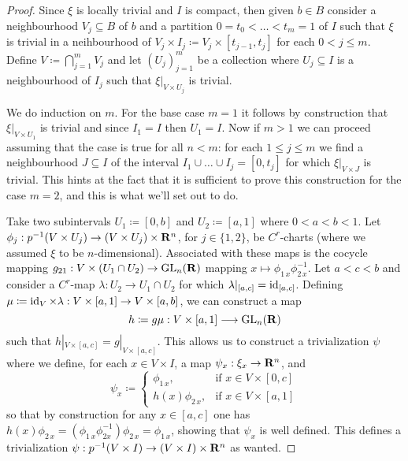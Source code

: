 \documentclass[../../../deep-dive]{subfile}
\begin{document}
\begin{proof}
Since \(\xi\) is locally trivial and \(I\) is compact, then given \(b \in B\)
consider a neighbourhood \(V_j \subseteq B\) of \(b\) and a partition
\(0 = t_0 < \dots < t_m = 1\) of \(I\) such that \(\xi\) is trivial in a
neihbourhood of \(V_j \times I_j \coloneq V_j \times [t_{j-1}, t_j]\) for each
\(0 < j \leq m\). Define \(V \coloneq \bigcap_{j=1}^m V_j\) and let
\((U_j)_{j=1}^m\) be a collection where \(U_j \subseteq I\) is a neighbourhood
of \(I_j\) such that \(\xi|_{V \times U_j}\) is trivial.

We do induction on \(m\). For the base case \(m = 1\) it follows by construction
that \(\xi|_{V \times U_1}\) is trivial and since \(I_1 = I\) then \(U_1 =
I\). Now if \(m > 1\) we can proceed assuming that the case is true for all
\(n < m\): for each \(1 \leq j \leq m\) we find a neighbourhood
\(J \subseteq I\) of the interval \(I_1 \cup \dots \cup I_j = [0, t_j]\) for
which \(\xi|_{V \times J}\) is trivial. This hints at the fact that it is
sufficient to prove this construction for the case \(m = 2\), and this is what
we'll set out to do.

Take two subintervals \(U_1 \coloneq [0, b]\) and \(U_2 \coloneq [a, 1]\) where
\(0 < a < b < 1\). Let
\(\phi_j: p^{-1}(V \times U_j) \to (V \times U_j) \times \mathbf{R}^n\), for
\(j \in \{1, 2\}\), be \(C^r\)-charts (where we assumed \(\xi\) to be
\(n\)-dimensional). Associated with these maps is the cocycle mapping
\(g_{2 1}: V \times (U_1 \cap U_2) \to \operatorname{GL}_n(\mathbf{R})\) mapping
\(x \mapsto \phi_{1\, x} \phi_{2\, x}^{-1}\). Let \(a < c < b\) and consider a
\(C^r\)-map \(\lambda: U_2 \to U_1 \cap U_2\) for which
\(\lambda|_{[a, c]} = \operatorname{id}_{[a, c]}\). Defining \(\mu \coloneq \operatorname{id}_V \times
\lambda: V \times [a, 1] \to V \times [a, b]\), we can construct a map
\[
h \coloneq g \mu: V \times [a, 1] \longrightarrow \operatorname{GL}_n(\mathbf{R})
\]
such that \(h|_{V \times [a, c]} = g|_{V \times [a, c]}\). This allows us to
construct a trivialization \(\psi\) where we define, for each \(x \in V \times
I\), a map \(\psi_x: \xi_x \to \mathbf{R}^n\), and
\[
\psi_x \coloneq
\begin{cases}
  \phi_{1\, x}, &\text{if } x \in V \times [0, c] \\
  h(x) \phi_{2\, x}, &\text{if } x \in V \times [a, 1]
\end{cases}
\]
so that by construction for any \(x \in [a, c]\) one has
\(h(x) \phi_{2\, x} = (\phi_{1\, x} \phi_{2 x}^{-1}) \phi_{2\, x} = \phi_{1\,
  x}\), showing that \(\psi_x\) is well defined. This defines a trivialization
\(\psi: p^{-1}(V \times I) \to (V \times I) \times \mathbf{R}^n\) as wanted.
\end{proof}
\end{document}
